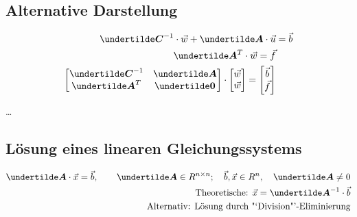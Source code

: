 \subsection{Alternative Darstellung}
\begin{align*}
\ma{C}^{-1} \cdot \vec{w} + \ma{A} \cdot \vec{u} &= \vec{b}\\
\ma{A}^T \cdot \vec{w} = \vec{f}\\
\begin{bmatrix}
\ma{C}^{-1} & \ma{A} \\ \ma{A}^T & \ma{0}\end{bmatrix} \cdot \begin{bmatrix}\vec{w} \\ \vec{w}\end{bmatrix} = \begin{bmatrix}\vec{b}\\\vec{f}\end{bmatrix}
\end{align*}

\ldots

\subsection{Lösung eines linearen Gleichungssystems}
\begin{align*}
\ma{A} \cdot \vec{x} = \vec{b}, \qquad \ma{A} \in R^{n\times n}; \quad \vec{b}, \vec{x} \in R^n, \quad \ma{A} \neq 0\\
\text{Theoretische: } \vec{x} = \ma{A}^{-1} \cdot \vec{b}\\
\text{Alternativ: Lösung durch "`Division"'-Eliminierung} 
\end{align*}

